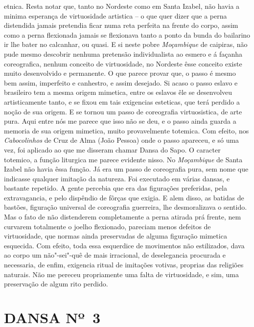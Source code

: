 etnica. Resta notar que, tanto no Nordeste como em Santa Izabel, não
havia a minima esperança de virtuosidade artistica -- o que quer dizer
que a perna distendida jamais pretendia ficar numa reta perfeita na
frente do corpo, assim como a perna flexionada jamais se flexionava
tanto a ponto da bunda do bailarino ir lhe bater no calcanhar, ou quasi.
E si neste pobre \emph{Moçambique} de caipiras, não pude mesmo descobrir
nenhuma pretensão individualista ao esmero e á façanha coreografica,
nenhum conceito de virtuosidade, no Nordeste êsse conceito existe muito
desenvolvido e permanente. O que parece provar que, o passo é mesmo bem
assim, imperfeito e canhestro, e assim desejado. Si acaso o passo eslavo
e brasileiro tem a mesma origem mimetica, entre os eslavos êle se
desenvolveu artisticamente tanto, e se fixou em tais exigencias
esteticas, que terá perdido a noção de sua origem. E se tornou um passo
de coreografia virtuosistica, de arte pura. Aqui entre nós me parece que
isso não se deu, e o passo ainda guarda a memoria de sua origem
mimetica, muito provavelmente totemica. Com efeito, nos
\emph{Cabocolinhos} de Cruz de Alma (João Pessoa) onde o passo apareceu,
e só uma vez, foi aplicado ao que me disseram chamar Dansa do Sapo. O
caracter totemico, a função liturgica me parece evidente nisso. No
\emph{Moçambique} de Santa Izabel não havia êssa função. Já era um passo
de coreografia pura, sem nome que indicasse qualquer imitação da
natureza. Foi executado em várias dansas, e bastante repetido. A gente
percebia que era das figurações preferidas, pela extravagancia, e pelo
dispêndio de fôrças que exigia. E alem disso, as batidas de bastões,
figuração universal de coreografia guerreira, lhe desmoralizava o
sentido. Mas o fato de não distenderem completamente a perna atirada prá
frente, nem curvarem totalmente o joelho flexionado, pareciam menos
defeitos de virtuosidade, que normas ainda preservadas de alguma
figuração mimetica esquecida. Com efeito, toda essa esquerdice de
movimentos não estilizados, dava ao corpo um não"-sei"-quê de mais
irracional, de deselegancia procurada e necessaria, de enfim, exigencia
ritual de imitações votivas, proprias das religiões naturais. Não me
pereceu propriamente uma falta de virtuosidade, e sim, uma preservação
de algum rito perdido.

\pagebreak

\section{DANSA Nº~3}


